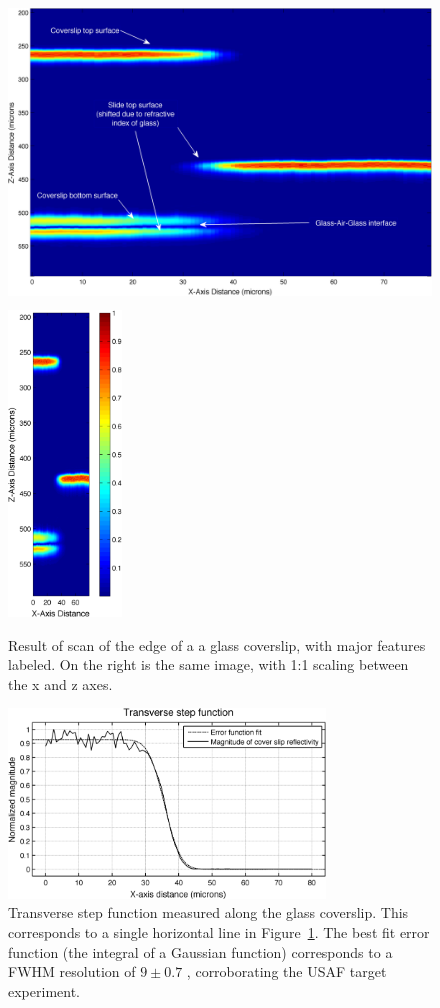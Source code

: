 \begin{figure}[h!]
\centering
\includegraphics[height=230pt]{Images/Results/coverslip_ann.png}
\includegraphics[height=230pt]{Images/Results/coverslip_equal.png}
\caption[Result of scan of the edge of a a glass coverslip.]{Result of scan of the edge of a a glass coverslip, with major features labeled. On the right is the same image, with 1:1 scaling between the x and z axes.\label{fig:coverslip1}}
\end{figure}

\begin{figure}[h!]
\centering
\includegraphics[width=0.75\textwidth]{Images/Results/line_step.png}
\caption[Transverse step function measured along the glass coverslip.]{Transverse step function measured along the glass coverslip. This corresponds to a single horizontal line in Figure~\ref{fig:coverslip1}. The best fit error function (the integral of a Gaussian function) corresponds to a FWHM resolution of $9 \pm 0.7$ \micron, corroborating the USAF target experiment.\label{fig:coverslip2}}
\end{figure}

